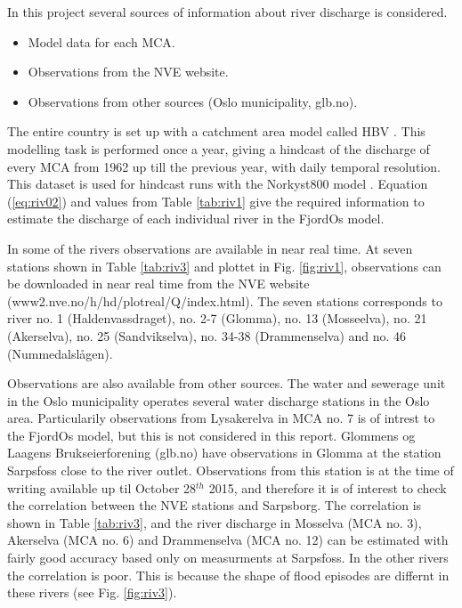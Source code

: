 In this project several sources of information about river discharge is considered.

\begin{itemize}
\item Model data for each MCA.
\item Observations from the NVE website. 
\item Observations from other sources (Oslo municipality, glb.no).
\end{itemize}

The entire country is set up with a catchment area model called HBV \citep{beldr:etal:2003}. This modelling task is performed once a year, giving a hindcast of the discharge of every MCA from 1962 up till the previous year, with daily temporal resolution. This dataset is used for hindcast runs with the Norkyst800 model \citep{albre:etal:2011}. Equation (\ref{eq:riv02}) and values from Table \ref{tab:riv1} give the required information to estimate the discharge of each individual river in the FjordOs model.

In some of the rivers observations are available in near real time. At seven stations shown in Table \ref{tab:riv3} and plottet in Fig. \ref{fig:riv1}, observations can be downloaded in near real time from the NVE website (www2.nve.no/h/hd/plotreal/Q/index.html). The seven stations corresponds to river no. 1 (Haldenvassdraget), no. 2-7 (Glomma), no. 13 (Mosseelva), no. 21 (Akerselva), no. 25 (Sandvikselva), 
no. 34-38 (Drammenselva) and no. 46 (Nummedalsl{\aa}gen).

Observations are also available from other sources. The water and sewerage unit in the Oslo municipality operates several water discharge stations in the Oslo area. Particularily observations from Lysakerelva in MCA no. 7 is of intrest to the FjordOs model, but this is not considered in this report. Glommens og Laagens Brukseierforening (glb.no) have observations in Glomma at the station Sarpsfoss close to the river outlet. Observations from this station is at the time of writing available up til October 28$^{th}$ 2015, and therefore it is of interest to check the correlation between the NVE stations and Sarpsborg. The correlation is shown in Table \ref{tab:riv3}, and the river discharge in Mosselva (MCA no. 3), Akerselva (MCA no. 6) and Drammenselva (MCA no. 12) can be estimated with fairly good accuracy based only on measurments at Sarpsfoss. In the other rivers the correlation is poor. This is because the shape of flood episodes are differnt in these rivers (see Fig. \ref{fig:riv3}).

